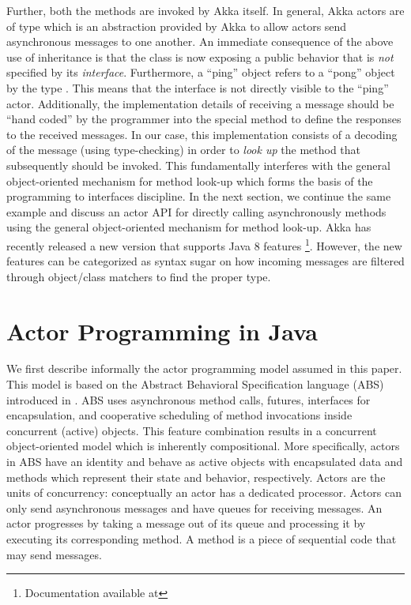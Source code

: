 Further, both the  methods are invoked by Akka  itself. 
In general, Akka actors are of type   which is an abstraction provided by Akka to allow actors send asynchronous messages to one another.
% 
An immediate consequence  of the above use of inheritance is that the class  is now exposing a public behavior 
that is \emph{not} specified by its \emph{interface}. 
Furthermore, a ``ping'' object refers to a ``pong'' object by the type  .
This means that the interface  is not directly visible to the ``ping'' actor.
Additionally, the implementation details of receiving a message should be 
``hand coded'' by the programmer into the  special method  to define the  responses to the received messages.
In our case, this implementation consists of a decoding of the message  (using type-checking)
in order to \emph{look up} the method that subsequently should be invoked.
This fundamentally interferes with the general object-oriented mechanism for method look-up which forms the basis of the programming to interfaces discipline.
In the next section, we continue the same example and discuss an actor API for directly calling asynchronously methods
using the general object-oriented mechanism for method look-up.
Akka has recently released a new version that supports Java 8 features
\footnote{Documentation available at }.
However, the new features can be categorized as syntax sugar on how incoming messages are filtered through object/class matchers to find the proper type.

\section{Actor Programming in Java}
\label{sec:actor:programming}

We first describe informally the actor programming model assumed in this paper. This model is based on the
Abstract Behavioral Specification language (ABS)  
introduced in \cite{johnsen2012abs}.
ABS uses asynchronous method calls, futures, interfaces for encapsulation, 
and cooperative scheduling of method invocations inside concurrent (active) objects. 
This feature combination results in a concurrent object-oriented model which is inherently compositional.
More specifically, actors in ABS  have an identity and behave as active
objects with encapsulated data and methods which represent their state
and behavior, respectively.  Actors are the units of concurrency: conceptually an actor has a dedicated processor. Actors can only send
asynchronous messages and have queues for receiving messages.  An
actor progresses by taking a message out of its queue and processing
it by executing its corresponding method.  A method is a piece of
sequential code that may send messages.
% 

